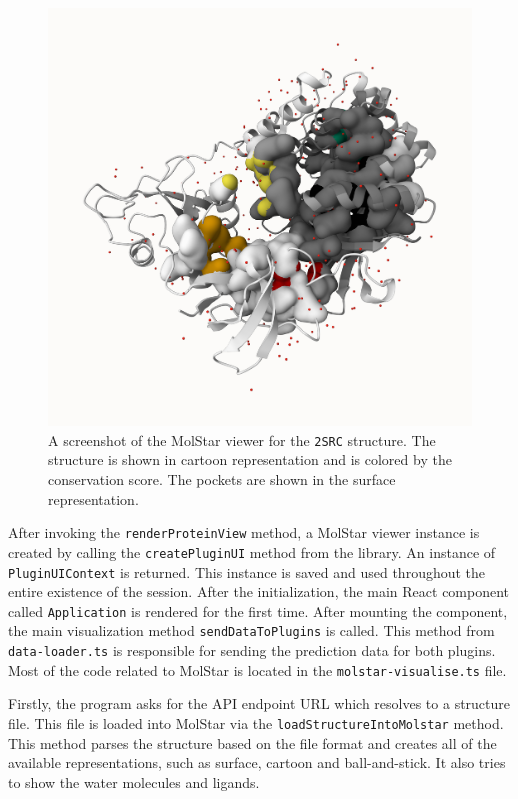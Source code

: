 \begin{figure}[htb]
    \centering
    \includegraphics[width=\textwidth]{img/molstar_2src.png}
    \caption{A screenshot of the MolStar viewer for the \texttt{2SRC} structure. The structure is shown in cartoon representation and is colored by the conservation score. The pockets are shown in the surface representation.}
    \label{fig:molstar}
\end{figure}

After invoking the \texttt{renderProteinView} method, a MolStar viewer instance is created by calling the \texttt{createPluginUI} method from the library. An instance of \texttt{PluginUIContext} is returned. This instance is saved and used throughout the entire existence of the session. After the initialization, the main React component called \texttt{Application} is rendered for the first time. After mounting the component, the main visualization method \texttt{sendDataToPlugins} is called. This method from \texttt{data-loader.ts} is responsible for sending the prediction data for both plugins. Most of the code related to MolStar is located in the \texttt{molstar-visualise.ts} file.

Firstly, the program asks for the API endpoint URL which resolves to a structure file. This file is loaded into MolStar via the \texttt{loadStructureIntoMolstar} method. This method parses the structure based on the file format and creates all of the available representations, such as surface, cartoon and ball-and-stick. It also tries to show the water molecules and ligands.

